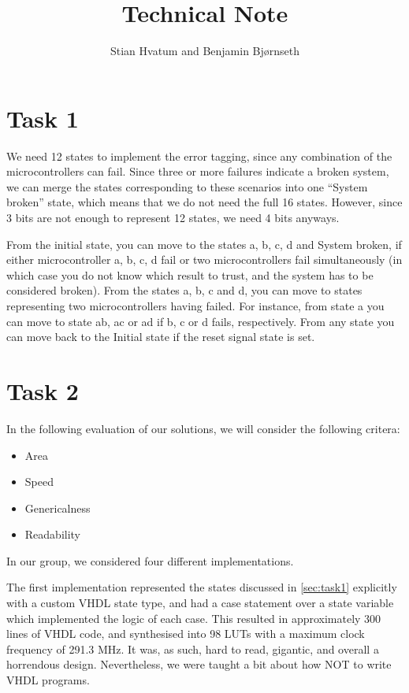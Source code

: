 \documentclass[11pt]{article}
\title{Technical Note}
\author{Stian Hvatum and Benjamin Bjørnseth}
\begin{document}
\maketitle

\section{Task 1}
\label{sec:task1}
We need 12 states to implement the error tagging, since any
combination of the microcontrollers can fail. Since three or more
failures indicate a broken system, we can merge the states
corresponding to these scenarios into one ``System broken'' state,
which means that we do not need the full 16 states. However, since 3
bits are not enough to represent 12 states, we need 4 bits anyways.

From the initial state, you can move to the states a, b, c, d and
System broken, if either microcontroller a, b, c, d fail or two
microcontrollers fail simultaneously (in which case you do not know
which result to trust, and the system has to be considered
broken). From the states a, b, c and d, you can move to states
representing two microcontrollers having failed. For instance, from
state a you can move to state ab, ac or ad if b, c or d fails,
respectively. From any state you can move back to the Initial state if
the reset signal state is set.

\section{Task 2}
\label{sec:task2}

In the following evaluation of our solutions, we will consider the
following critera:
\begin{itemize}

\item Area
\item Speed
\item Genericalness
\item Readability

\end{itemize}

In our group, we considered four different implementations. 

The first implementation represented the states discussed in
\autoref{sec:task1} explicitly with a custom VHDL state type, and had
a case statement over a state variable which implemented the logic of
each case. This resulted in approximately 300 lines of VHDL code, and
synthesised into 98 LUTs with a maximum clock frequency of 291.3
MHz. It was, as such, hard to read, gigantic, and overall a horrendous
design. Nevertheless, we were taught a bit about how NOT to write VHDL
programs.
\end{document}
